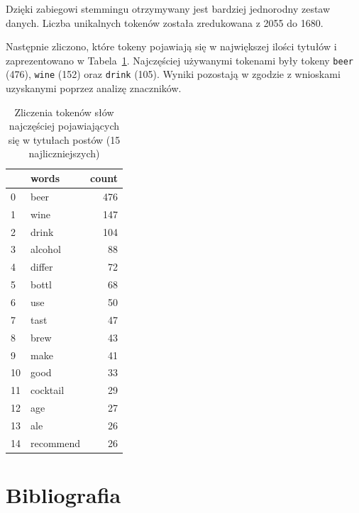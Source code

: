 \documentclass[
  letterpaper,
  DIV=11,
  numbers=noendperiod]{scrreprt}
\begin{document}
Dzięki zabiegowi stemmingu otrzymywany jest bardziej jednorodny zestaw
danych. Liczba unikalnych tokenów została zredukowana z 2055 do 1680.

Następnie zliczono, które tokeny pojawiają się w największej ilości
tytułów i zaprezentowano w Tabela~\ref{tbl-tokens_count}. Najczęściej
używanymi tokenami były tokeny \texttt{beer} (476), \texttt{wine} (152)
oraz \texttt{drink} (105). Wyniki pozostają w zgodzie z wnioskami
uzyskanymi poprzez analizę znaczników.

\hypertarget{tbl-tokens_count}{}
\begin{table}
\caption{\label{tbl-tokens_count}Zliczenia tokenów słów najczęściej pojawiających się w tytułach postów
(15 najliczniejszych) }\tabularnewline

\centering
\begin{tabular}{llr}
\toprule
{} &      words &  count \\
\midrule
0  &       beer &    476 \\
1  &       wine &    147 \\
2  &      drink &    104 \\
3  &    alcohol &     88 \\
4  &     differ &     72 \\
5  &      bottl &     68 \\
6  &        use &     50 \\
7  &       tast &     47 \\
8  &       brew &     43 \\
9  &       make &     41 \\
10 &       good &     33 \\
11 &   cocktail &     29 \\
12 &        age &     27 \\
13 &        ale &     26 \\
14 &  recommend &     26 \\
\bottomrule
\end{tabular}
\end{table}


\hypertarget{bibliografia}{%
\chapter*{Bibliografia}\label{bibliografia}}

\end{document}
